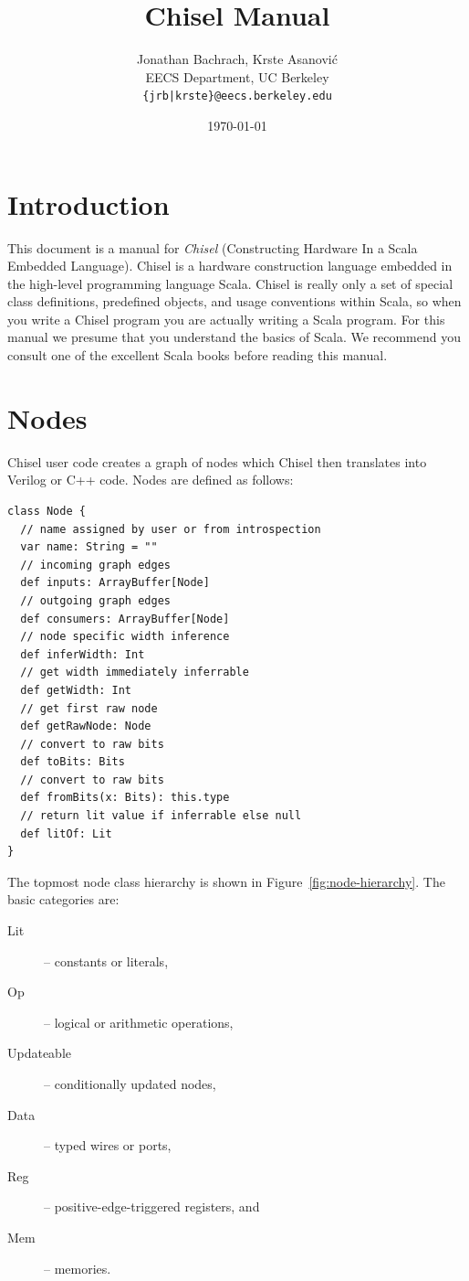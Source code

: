 \documentclass[10pt,twocolumn]{article}
\title{Chisel Manual}
\author{Jonathan Bachrach, Krste Asanovi\'{c} \\
EECS Department, UC Berkeley\\
{\tt  \{jrb|krste\}@eecs.berkeley.edu}
}
\date{\today}
\begin{document}
\maketitle{}




\section{Introduction}

This document is a manual for {\em Chisel} (Constructing
Hardware In a Scala Embedded Language).  Chisel is a hardware
construction language embedded in the high-level programming language
Scala.  Chisel is really only a set of special class
definitions, predefined objects, and usage conventions within Scala,
so when you write a Chisel program you are actually writing a Scala
program.  For this manual we presume that you
understand the basics of Scala.  
We recommend you consult one of the excellent
Scala books before reading this manual.

\section{Nodes}

Chisel user code creates a graph of nodes which Chisel then translates
into Verilog or C++ code.  Nodes are defined as follows:

\begin{lstlisting}
class Node {
  // name assigned by user or from introspection
  var name: String = ""
  // incoming graph edges
  def inputs: ArrayBuffer[Node]
  // outgoing graph edges
  def consumers: ArrayBuffer[Node]
  // node specific width inference
  def inferWidth: Int
  // get width immediately inferrable
  def getWidth: Int
  // get first raw node
  def getRawNode: Node
  // convert to raw bits 
  def toBits: Bits
  // convert to raw bits 
  def fromBits(x: Bits): this.type
  // return lit value if inferrable else null
  def litOf: Lit
}
\end{lstlisting}


The topmost node class hierarchy is shown in
Figure~\ref{fig:node-hierarchy}.  The basic categories are:

\begin{description}
\item[Lit] -- constants or literals,
\item[Op] -- logical or arithmetic operations,
\item[Updateable] -- conditionally updated nodes,
\item[Data] -- typed wires or ports,
\item[Reg] -- positive-edge-triggered registers, and
\item[Mem] -- memories.
\end{description}
\end{document}
